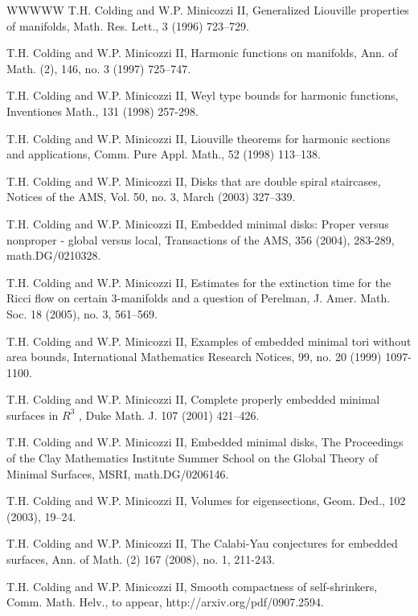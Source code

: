 \begin{thebibliography}{WWWWW}
 T.H. Colding and W.P. Minicozzi II, Generalized Liouville properties of manifolds, Math. Res. Lett., 3 (1996) 723–729.

 T.H. Colding and W.P. Minicozzi II, Harmonic functions on manifolds, Ann. of Math. (2), 146, no. 3 (1997) 725–747.

 T.H. Colding and W.P. Minicozzi II, Weyl type bounds for harmonic functions, Inventiones Math., 131 (1998) 257-298.

 T.H. Colding and W.P. Minicozzi II, Liouville theorems for harmonic sections and applications, Comm. Pure Appl. Math., 52 (1998) 113–138.

 T.H. Colding and W.P. Minicozzi II, Disks that are double spiral staircases, Notices of the AMS, Vol. 50, no. 3, March (2003) 327–339.

 T.H. Colding and W.P. Minicozzi II, Embedded minimal disks: Proper versus nonproper - global versus local, Transactions of the AMS, 356 (2004), 283-289, math.DG/0210328.

 T.H. Colding and W.P. Minicozzi II, Estimates for the extinction time for the Ricci flow on certain 3-manifolds and a question of Perelman, J. Amer. Math. Soc. 18 (2005), no. 3, 561–569.

 T.H. Colding and W.P. Minicozzi II, Examples of embedded minimal tori without area bounds, International Mathematics Research Notices, 99, no. 20 (1999) 1097-1100.

 T.H. Colding and W.P. Minicozzi II, Complete properly embedded minimal surfaces in $R^{3}$ , Duke Math. J. 107 (2001) 421–426.

 T.H. Colding and W.P. Minicozzi II, Embedded minimal disks, The Proceedings of the Clay Mathematics Institute Summer School on the Global Theory of Minimal Surfaces, MSRI, math.DG/0206146.

 T.H. Colding and W.P. Minicozzi II, Volumes for eigensections, Geom. Ded., 102 (2003), 19–24.

 T.H. Colding and W.P. Minicozzi II, The Calabi-Yau conjectures for embedded surfaces, Ann. of Math. (2) 167 (2008), no. 1, 211-243.

 T.H. Colding and W.P. Minicozzi II, Smooth compactness of self-shrinkers, Comm. Math. Helv., to appear, http://arxiv.org/pdf/0907.2594.


\end{thebibliography}
